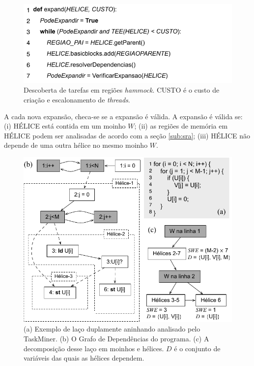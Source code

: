 \documentclass[sigplan,10pt]{acmart}
\newcommand\Taskminer{\mbox{\textsf{TaskMiner}}}
\begin{document}
\begin{figure}[h]
\begin{center}
\includegraphics[width=1\columnwidth]{images/expand_alg}
\caption{Descoberta de tarefas em regiões {\em hammock}.
\textsf{CUSTO} é o custo de criação e escalonamento de {\em threads}.}
\label{fig:expand_alg}
\end{center}
\end{figure}

A cada nova expansão, checa-se se a expansão é válida. A expansão é válida se:
(i) \textsf{HÉLICE} está contida em um moinho $W$;
(ii) as regiões de memória em \textsf{HÉLICE} podem ser analisadas de acordo com
a seção \ref{sub:sra};
(iii) \textsf{HÉLICE} não depende de uma outra hélice no mesmo moinho $W$.

\begin{figure}[h]
\begin{center}
\includegraphics[width=1\columnwidth]{images/ex_expansion}
\caption{(a) Exemplo de laço duplamente aninhando analisado pelo {\Taskminer}.
(b) O Grafo de Dependências do programa.
(c) A decomposição desse laço em moinhos e hélices. $D$ é o conjunto de variáveis
das quais as hélices dependem.}
\label{fig:ex_expansion}
\end{center}
\end{figure}
\end{document}
